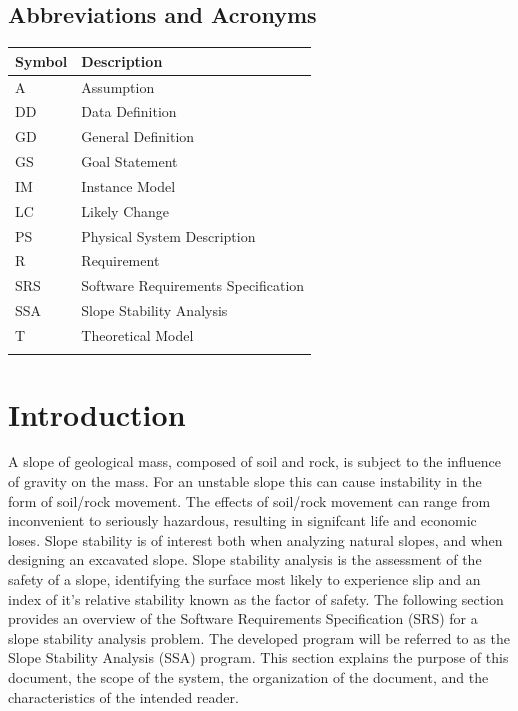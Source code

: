 \documentclass[12pt]{article}
\begin{document}
\subsection{Abbreviations and Acronyms}
\label{Sec:AbbrandAcro}
\begin{longtable*}{l l}
\toprule
Symbol & Description
\\
\midrule
A & Assumption
\\
DD & Data Definition
\\
GD & General Definition
\\
GS & Goal Statement
\\
IM & Instance Model
\\
LC & Likely Change
\\
PS & Physical System Description
\\
R & Requirement
\\
SRS & Software Requirements Specification
\\
SSA & Slope Stability Analysis
\\
T & Theoretical Model
\\
\bottomrule
\label{Table:AbbrandAcro}
\end{longtable*}
\section{Introduction}
\label{Sec:Intr}
A slope of geological mass, composed of soil and rock, is subject to the influence of gravity on the mass. For an unstable slope this can cause instability in the form of soil/rock movement. The effects of soil/rock movement can range from inconvenient to seriously hazardous, resulting in signifcant life and economic loses. Slope stability is of interest both when analyzing natural slopes, and when designing an excavated slope. Slope stability analysis is the assessment of the safety of a slope, identifying the surface most likely to experience slip and an index of it's relative stability known as the factor of safety.
The following section provides an overview of the Software Requirements Specification (SRS) for a slope stability analysis problem. The developed program will be referred to as the Slope Stability Analysis (SSA) program. This section explains the purpose of this document, the scope of the system, the organization of the document, and the characteristics of the intended reader.
\end{document}
